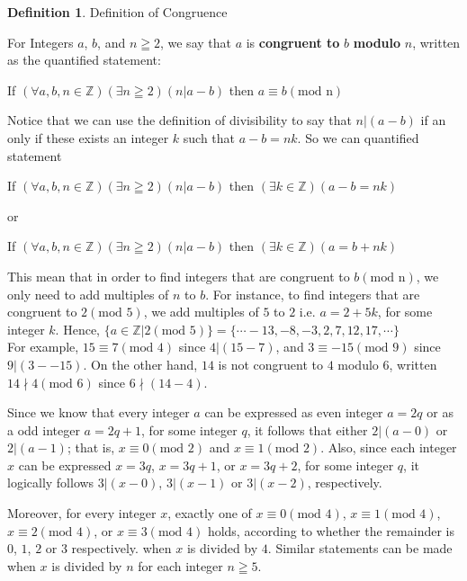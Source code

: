 \documentclass{book}
\theoremstyle{definition}
\newtheorem{definition}{Definition}[section]
\theoremstyle{remark}
\newcommand{\bb}[1]{\mathbb{#1}}
\begin{document}
\begin{definition}
Definition of Congruence

\begin{tcolorbox}
For Integers $a$, $b$, and $n \geqq 2$, we say that $a$ is {\bf congruent to} $b$ {\bf modulo} $n$, written as the quantified statement: 
	\begin{center}
		If $(\forall a,b,n \in \bb{Z})(\exists n \geqq 2)(n | a-b)$ then  $a \equiv b(\text{mod n})$
	\end{center}
Notice that  we can use the definition of divisibility to say that $n | (a-b)$ if an only if these exists an integer $k$ such that $a-b = nk$. So we can quantified statement
	\begin{center}
		If $(\forall a,b,n \in \bb{Z})(\exists n \geqq 2)(n | a-b)$ then  $(\exists k \in \bb{Z})(a-b = nk)$
	\end{center}
or
	\begin{center}
		If $(\forall a,b,n \in \bb{Z})(\exists n \geqq 2)(n | a-b)$ then  $(\exists k \in \bb{Z})(a= b + nk)$
	\end{center}

\end{tcolorbox}
This mean that in order to find integers that are congruent to $b(\text{mod n})$, we only need to add multiples of $n$ to $b$. For instance, to find integers that are congruent to $2(\text{mod 5})$, we add multiples of $5$ to $2$ i.e. $a = 2 + 5k$, for some integer $k$. Hence, $\{ a \in \bb{Z} | 2(\text{mod 5})\} = \{ \cdots -13, -8, -3, 2, 7, 12, 17, \cdots \}$ \\

For example, $15 \equiv 7 (\text{mod 4})$ since $4 | (15-7)$, and $3 \equiv -15 (\text{mod 9})$ since $9 | (3--15)$. On the other hand, $14$ is not congruent to $4$ modulo $6$, written $14 \nmid 4 (\text{mod 6})$ since $ 6 \nmid (14 -4)$.

Since we know that every integer $a$ can be expressed as even integer $a = 2q$ or as a odd integer $a = 2q + 1$, for some integer $q$, it follows that either $2 | (a -0)$ or $2 | (a - 1)$; that is, $x \equiv 0 (\text{mod 2})$ and $x \equiv 1 (\text{mod 2})$. Also, since each integer $x$ can be expressed $x = 3q$, $x = 3q + 1$, or $x = 3q + 2$, for some integer $q$, it logically follows $3 | (x - 0)$, $3 | (x-1)$ or $3 | (x - 2)$, respectively. 

Moreover, for every integer $x$, exactly one of $x \equiv 0(\text{mod 4})$, $x \equiv 1(\text{mod 4})$, $x \equiv 2(\text{mod 4})$, or $x \equiv 3(\text{mod 4})$ holds, according to whether the remainder is $0$, $1$, $2$ or $3$ respectively. when $x$ is divided by $4$. Similar statements can be made when $x$ is divided by $n$ for each integer $n \geqq 5$. 

\end{definition}
\end{document}
